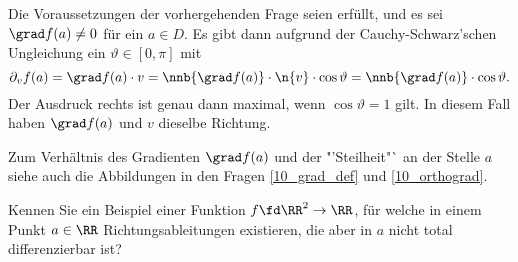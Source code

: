 \begin{antwort}
  Die Voraussetzungen der vorhergehenden Frage seien erfüllt, und es sei 
  $\grad f(a) \not=0 $ für ein $a\in D$. Es gibt dann aufgrund der 
  Cauchy-Schwarz'schen Ungleichung ein $\vartheta \in [0,\pi]$ mit 
  \[
  \partial_v f(a) = \grad f(a) \cdot v = \nnb{ \grad f(a) } \cdot 
  \n{ v } \cdot \cos\vartheta = \nnb{ \grad f(a) }\cdot  \cos \vartheta.
  \]
  Der Ausdruck rechts ist genau dann maximal, wenn $\cos \vartheta=1$ gilt. 
  In diesem Fall haben $\grad f(a)$ und $v$ dieselbe Richtung. 

  Zum Verhältnis des Gradienten $\grad f(a)$ und der "'Steilheit"` an der Stelle $a$ siehe auch die Abbildungen in den Fragen \ref{10_grad_def} und \ref{10_orthograd}.
  \AntEnd 



\end{antwort}

\begin{frage}
  Kennen Sie ein Beispiel einer Funktion $f \fd \RR^2 \to \RR$, 
  für welche in einem Punkt $a\in \RR$  Richtungsableitungen 
  existieren, die aber in $a$ nicht total differenzierbar ist?
\end{frage}


